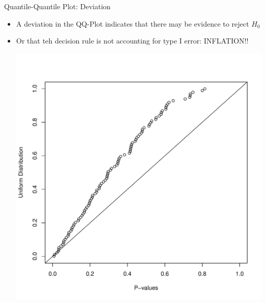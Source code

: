 \documentclass[xcolor=x11names,compress]{beamer}\usepackage[]{graphicx}\usepackage[]{color}
\newenvironment{knitrout}{}{} %
\begin{document}
\begin{frame}{Quantile-Quantile Plot: Deviation}
  \begin{itemize}
  \item A deviation in the QQ-Plot indicates that there may be evidence
        to reject $H_0$ 
  \item Or that teh decision rule is not accounting for type I error: INFLATION!!
\begin{knitrout}\tiny
{}\color{fgcolor}

{\centering \includegraphics[width=.6\linewidth]{figure/beamer-unnamed-chunk-19-1} 

}



\end{knitrout}
  \end{itemize}
\end{frame}
\end{document}
